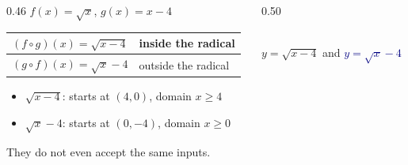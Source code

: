 \documentclass[aspectratio=169, 11pt]{beamer}
\newcommand{\lgrid}[4]{%
  \draw[step=1, linegray!45, thin] (#1,#3) grid (#2,#4);
  \draw[->, thick, charcoal] (#1,0)--(#2,0) node[below right, font=\tiny]{$x$};
  \draw[->, thick, charcoal] (0,#3)--(0,#4) node[left, font=\tiny]{$y$};}
\begin{document}
\begin{frame}[t, plain]
  \begin{columns}[T]
    \begin{column}{0.46\textwidth}
      \footnotesize
      $f(x)=\sqrt{x}$, \quad $g(x)=x-4$
      \vspace{4pt}
      \begin{center}
      \renewcommand{\arraystretch}{1.4}
      \begin{tabular}{|l|l|}
      \hline
      $(f\circ g)(x)=\sqrt{x-4}$ & inside the radical \\ \hline
      $(g\circ f)(x)=\sqrt{x}-4$ & outside the radical \\ \hline
      \end{tabular}
      \end{center}
      \vspace{4pt}
      \begin{itemize}\setlength{\itemsep}{3pt}
        \item $\sqrt{x-4}$: starts at $(4,0)$, domain $x\ge4$
        \item $\sqrt{x}-4$: starts at $(0,-4)$, domain $x\ge0$
      \end{itemize}
      \vspace{3pt}
      \begin{center}They do not even accept the same inputs.\end{center}
    \end{column}
    \begin{column}{0.50\textwidth}
      \centering
      \\[2pt]
      {\scriptsize \textcolor{forest}{$y=\sqrt{x-4}$} \; and \; \textcolor{navy}{$y=\sqrt{x}-4$}}
    \end{column}
  \end{columns}
\end{frame}
\end{document}
